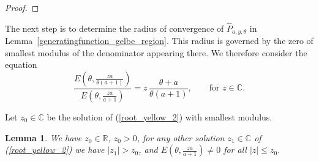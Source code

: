 \documentclass[12pt]{article}
\newcommand{\R}{\mathbb{R}} %
\newcommand{\C}{\mathbb{C}} %
\newcommand{\1}{\mathds{1}}
\theoremstyle{definition}
\theoremstyle{plain}
\newtheorem{Lemma}[definition]{Lemma}
\theoremstyle{remark}
\begin{document}
\begin{proof}
\end{proof}

The next step is to determine the radius of convergence of $\hat P_{a,y,\theta}$ in Lemma~\ref{generatingfunction_gelbe_region}. This radius is governed by the zero of smallest modulus of the denominator appearing there. We therefore consider the equation
\begin{equation}\label{root_yellow_2}
\frac{E\left(\theta,\frac{za}{\theta(a+1)}\right)}{E\left(\theta,\frac{za}{a+1}\right)} = z \,\frac{\theta+a}{\theta(a+1)},\qquad \text{for $z\in\C$}.
\end{equation}

Let $z_0\in\C$ be the solution of (\ref{root_yellow_2}) with smallest modulus.

\begin{Lemma}\label{lemma_root_yellow}
We have $z_0\in\R$, $z_0>0$, for any other solution $z_1\in\C$ of (\ref{root_yellow_2}) we have $|z_1|>z_0$, and $E(\theta,\frac{za}{a+1})\neq 0$ for all $|z|\leq z_0$.
\end{Lemma}
\end{document}
